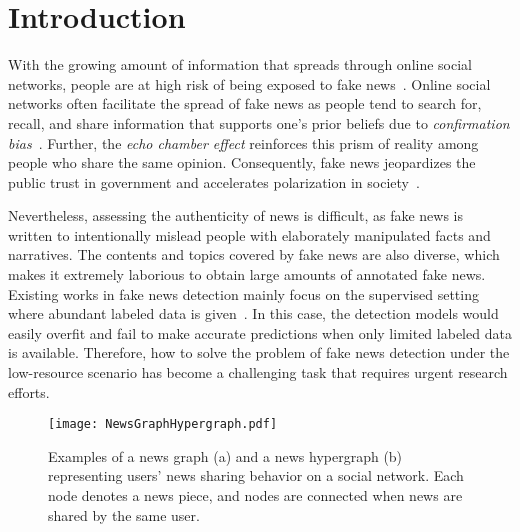\documentclass[conference]{IEEEtran}
\begin{document}
\section{Introduction}
With the growing amount of information that spreads through online social networks, people are at high risk of being exposed to fake news~\cite{vosoughi2018spread}. Online social networks often facilitate the spread of fake news as people tend to search for, recall, and share information that supports one’s prior beliefs due to \textit{confirmation bias}~\cite{nickerson1998confirmation}. Further, the \textit{echo chamber effect}\cite{cinelli2021echo} reinforces
this prism of reality among people who share the same opinion. Consequently, fake news jeopardizes the public trust in government and accelerates polarization in society~\cite{shu2020early}.

Nevertheless, assessing the authenticity of news is difficult, as fake news is written to intentionally mislead people with elaborately manipulated facts and narratives. The contents and topics covered by fake news are also diverse, which makes it extremely laborious to obtain large amounts of annotated fake news. Existing works in fake news detection mainly focus on the supervised setting where abundant labeled data is given~\cite{shu2019beyond, monti2019fake, ren2021fake}. In this case, the detection models would easily overfit and fail to make accurate predictions when only limited labeled data is available. Therefore, how to solve the problem of fake news detection under the low-resource scenario has become a challenging task that requires urgent research efforts.


\begin{figure}
\centering
\vspace{-0.5cm}
\texttt{[image: NewsGraphHypergraph.pdf]}
\caption{Examples of a news graph (a) and a news hypergraph (b) representing users' news sharing behavior on a social network. Each node denotes a news piece, and nodes are connected when news are shared by the same user.
} \label {NewsGraphHypergraph}


\vspace{-0.5cm}
\end{figure}
\end{document}

